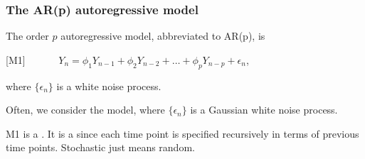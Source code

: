 \begin{frame}[fragile]


\frametitle{The AR(p) autoregressive model}

\bi

\item The order $p$ autoregressive model,  abbreviated to AR(p), is

\vspace{2mm}

[M1] $\quad\quad \quad Y_n = \phi_1 Y_{n-1}+\phi_2Y_{n-2}+\dots+\phi_pY_{n-p} + \epsilon_n$,

\vspace{2mm}

where $\{\epsilon_n\}$ is a white noise process. 


\item Often, we consider the  model, where  $\{\epsilon_n\}$ is a Gaussian white noise process. 

\item M1 is a . It is a  since each time point is specified recursively in terms of previous time points. Stochastic just means random.


\ei

\end{frame}

